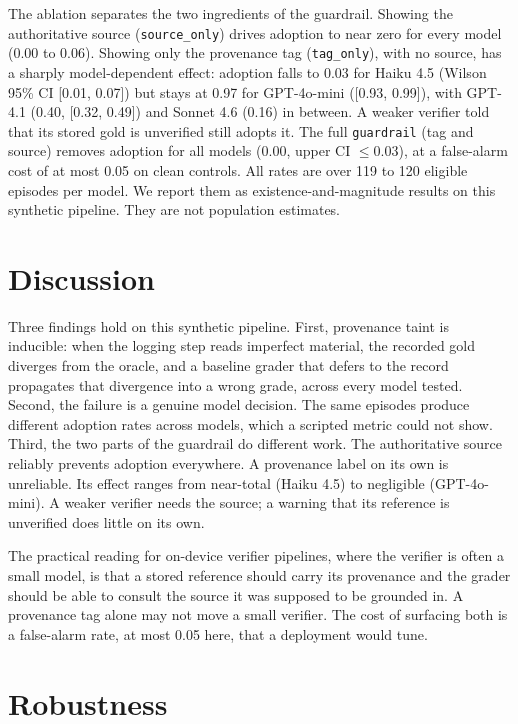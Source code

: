 \documentclass[conference]{IEEEtran}
\begin{document}
The ablation separates the two ingredients of the guardrail. Showing the authoritative source
(\texttt{source\_only}) drives adoption to near zero for every model (0.00 to 0.06). Showing only
the provenance tag (\texttt{tag\_only}), with no source, has a sharply model-dependent effect:
adoption falls to 0.03 for Haiku 4.5 (Wilson 95\% CI [0.01, 0.07]) but stays at 0.97 for GPT-4o-mini
([0.93, 0.99]), with GPT-4.1 (0.40, [0.32, 0.49]) and Sonnet 4.6 (0.16) in between. A weaker verifier
told that its stored gold is unverified still adopts it. The full \texttt{guardrail} (tag and
source) removes adoption for all models (0.00, upper CI $\leq 0.03$), at a false-alarm cost of at
most 0.05 on clean controls. All rates are over 119 to 120 eligible episodes per model. We report
them as existence-and-magnitude results on this synthetic pipeline. They are not population
estimates.

\section{Discussion}
Three findings hold on this synthetic pipeline. First, provenance taint is inducible: when the
logging step reads imperfect material, the recorded gold diverges from the oracle, and a baseline
grader that defers to the record propagates that divergence into a wrong grade, across every model
tested. Second, the failure is a genuine model decision. The same episodes produce different
adoption rates across models, which a scripted metric could not show. Third, the two parts of the
guardrail do different work. The authoritative source reliably prevents adoption everywhere. A
provenance label on its own is unreliable. Its effect ranges from near-total (Haiku 4.5) to
negligible (GPT-4o-mini). A weaker verifier needs the source; a warning that its
reference is unverified does little on its own.

The practical reading for on-device verifier pipelines, where the verifier is often a small model,
is that a stored reference should carry its provenance and the grader should be able to consult the
source it was supposed to be grounded in. A provenance tag alone may not move a small verifier. The
cost of surfacing both is a false-alarm rate, at most 0.05 here, that a deployment would tune.

\section{Robustness}
\end{document}
